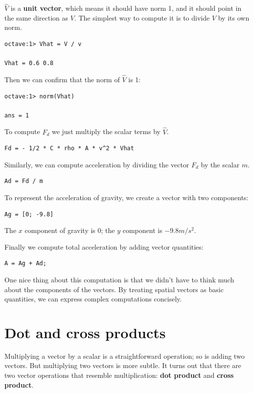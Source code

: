 \documentclass{book}
\begin{document}
$\hat{V}$ is a {\bf unit vector}, which means it should have norm 1,
and it should point in the same direction as $V$. The simplest
way to compute it is to divide $V$ by its own norm.

\begin{verbatim}
octave:1> Vhat = V / v

Vhat = 0.6 0.8
\end{verbatim}

Then we can confirm that the norm of $\hat{V}$ is 1:

\begin{verbatim}
octave:1> norm(Vhat)

ans = 1
\end{verbatim}

To compute $F_d$ we just multiply the scalar terms by $\hat{V}$.

\begin{verbatim}
Fd = - 1/2 * C * rho * A * v^2 * Vhat
\end{verbatim}

Similarly, we can compute acceleration by dividing the vector
$F_d$ by the scalar $m$.

\begin{verbatim}
Ad = Fd / m
\end{verbatim}

To represent the acceleration of gravity, we create a vector 
with two components:

\begin{verbatim}
Ag = [0; -9.8]
\end{verbatim}

The $x$ component of gravity is 0; the $y$ component is $-9.8 m/s^2$.

Finally we compute total acceleration by adding vector
quantities:

\begin{verbatim}
A = Ag + Ad;
\end{verbatim}

One nice thing about this computation is that we didn't have to
think much about the components of the vectors. By treating
spatial vectors as basic quantities, we can express complex computations
concisely.


\section{Dot and cross products}

Multiplying a vector by a scalar is a straightforward operation;
so is adding two vectors. But multiplying two vectors is more
subtle. It turns out that there are two vector operations that
resemble multiplication: {\bf dot product}
and {\bf cross product}.
\end{document}
